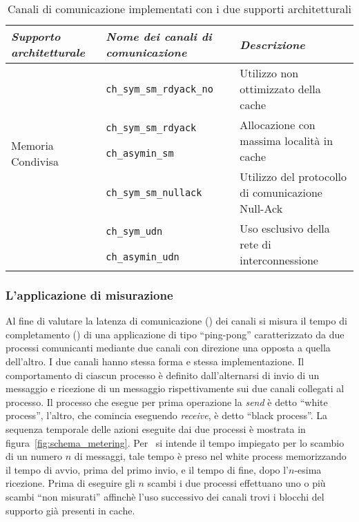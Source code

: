 \begin{table}[!b]
  \centering
  \begin{tabular}{ |m{15ex}|m{23ex}|m{26ex}| }
    \hline
    \textit{Supporto architetturale} & \textit{Nome dei canali di comunicazione} & \textit{Descrizione} \\
    \hline
    \multirow{5}{15ex}{Memoria Condivisa}  & \verb+ch_sym_sm_rdyack_no+ & Utilizzo non ottimizzato della cache \\
    \cline{2-3}
    & \verb+ch_sym_sm_rdyack+ & \multirow{2}{26ex}{Allocazione con massima localit\`a in cache} \\
    & \verb+ch_asymin_sm+ & \\
    \cline{2-3}
    & \verb+ch_sym_sm_nullack+ & Utilizzo del protocollo di comunicazione Null-Ack \\
    \hline
    \multirow{2}{*}{UDN} & \verb+ch_sym_udn+ & \multirow{2}{26ex}{Uso esclusivo della rete di interconnessione} \\
    & \verb+ch_asymin_udn+ & \\
    \hline
  \end{tabular}
  \caption[Nomi dei canali di comunicazione realizzati]{Canali di comunicazione implementati con i due supporti architetturali}
  \label{tab:implementazioni}
\end{table}

\subsubsection{L'applicazione di misurazione}
Al fine di valutare la latenza di comunicazione (\Lcom) dei canali si misura il tempo di completamento (\Tc) di una applicazione di tipo ``ping-pong'' caratterizzato da due processi comunicanti mediante due canali con direzione una opposta a quella dell'altro. I due canali hanno stessa forma e stessa implementazione. Il comportamento di ciascun processo \`e definito dall'alternarsi di invio di un messaggio e ricezione di un messaggio rispettivamente sui due canali collegati al processo. Il processo che esegue per prima operazione la \emph{send} \`e detto ``white process'', l'altro, che comincia eseguendo \emph{receive}, \`e detto ``black process''. La sequenza temporale delle azioni eseguite dai due processi \`e mostrata in figura~\ref{fig:schema_metering}. Per \Tc\ si intende il tempo impiegato per lo scambio di un numero $n$ di messaggi, tale tempo \`e preso nel white process memorizzando il tempo di avvio, prima del primo invio, e il tempo di fine, dopo l'$n$-esima ricezione. Prima di eseguire gli $n$ scambi i due processi effettuano uno o pi\`u scambi ``non misurati'' affinch\`e l'uso successivo dei canali trovi i blocchi del supporto gi\`a presenti in cache. 

